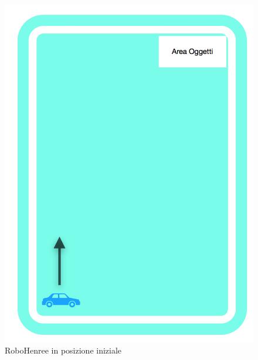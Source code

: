 \documentclass[a4paper,12pt,italian]{article}
\begin{document}
\begin{figure}[H]
	\begin{center}
	\includegraphics[scale=0.3]{movimento_1}
	\caption{RoboHenree in posizione iniziale}
	\label{Fig: movimento_1}
	\end{center}
\end{figure}
\end{document}
